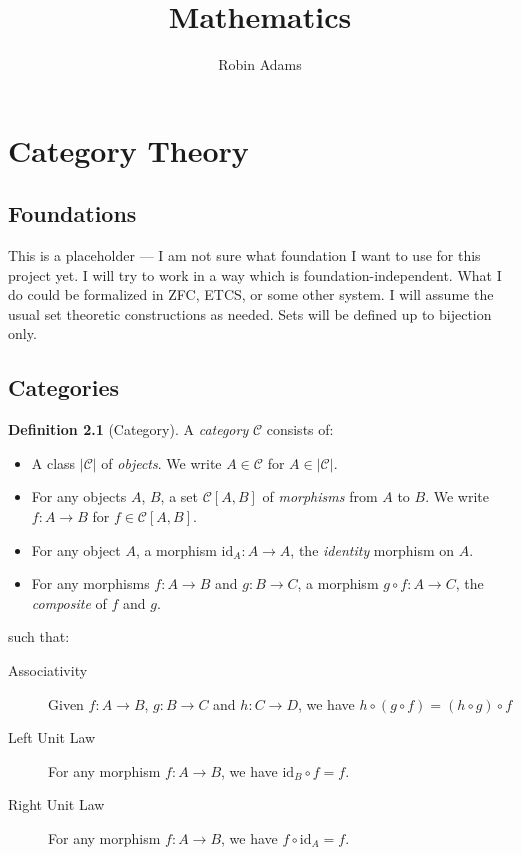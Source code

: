 \documentclass{book}
\title{Mathematics}
\author{Robin Adams}
\theoremstyle{definition}
\newtheorem{df}[prop]{Definition}
\newcommand{\id}[1]{\ensuremath{\mathrm{id}_{#1}}}
\begin{document}
\maketitle
\tableofcontents

\part{Category Theory}

\chapter{Foundations}

This is a placeholder --- I am not sure what foundation I want to use for this
project yet. I will try to work in a way which is foundation-independent. What
I do could be formalized in ZFC, ETCS, or some other system. I will assume the
usual set theoretic constructions as needed. Sets will be defined up to
bijection only.

\chapter{Categories}

\begin{df}[Category]
    A \emph{category} $\mathcal{C}$ consists of:
    \begin{itemize}
        \item A class $|\mathcal{C}|$ of \emph{objects}. We write $A \in \mathcal{C}$ for $A
                  \in |\mathcal{C}|$.
        \item For any objects $A$, $B$, a set $\mathcal{C}[A,B]$ of \emph{morphisms} from $A$
              to $B$. We write $f : A \rightarrow B$ for $f \in \mathcal{C}[A,B]$.
        \item For any object $A$, a morphism $\id{A} : A \rightarrow A$, the \emph{identity}
              morphism on $A$.
        \item For any morphisms $f : A \rightarrow B$ and $g : B \rightarrow C$, a morphism
              $g \circ f : A \rightarrow C$, the \emph{composite} of $f$ and $g$.
    \end{itemize}
    such that:
    \begin{description}
        \item[Associativity] Given $f : A \rightarrow B$, $g : B \rightarrow C$ and $h : C
                \rightarrow D$, we have $h \circ (g \circ f) = (h \circ g) \circ f$
        \item[Left Unit Law] For any morphism $f : A \rightarrow B$, we have $\id{B} \circ f
                = f$.
        \item[Right Unit Law] For any morphism $f : A \rightarrow B$, we have $f \circ \id{A}
                = f$.
    \end{description}
\end{df}
\end{document}
